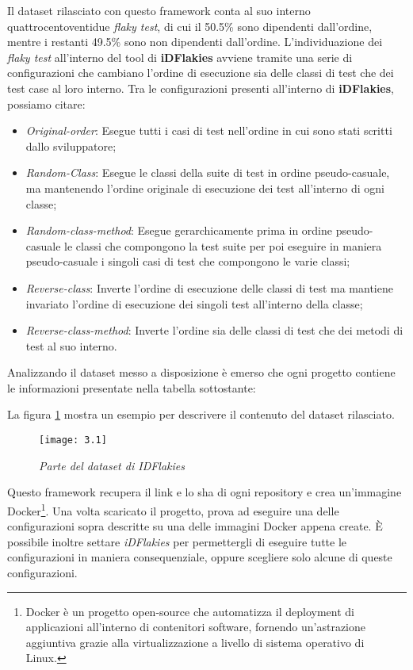 Il dataset rilasciato con questo framework conta al suo interno
quattrocentoventidue \emph{flaky test}, di cui il 50.5\% sono dipendenti dall’ordine, mentre i restanti 49.5\% sono non dipendenti dall’ordine.
L’individuazione dei \emph{flaky test} all’interno del tool di \textbf{iDFlakies} avviene tramite una serie di configurazioni che cambiano l’ordine di esecuzione sia delle classi di test che dei test case al loro interno.
Tra le configurazioni presenti all’interno di \textbf{iDFlakies}, possiamo citare:
\begin{itemize}
	\item \emph{Original-order}: Esegue tutti i casi di test nell’ordine in cui sono stati scritti
	dallo sviluppatore;
	\item \emph{Random-Class}: Esegue le classi della suite di test in ordine pseudo-casuale, ma mantenendo l’ordine originale di esecuzione dei test all’interno di ogni classe;
	\item \emph{Random-class-method}: Esegue gerarchicamente prima in ordine pseudo-casuale le classi che compongono la test suite per poi eseguire in maniera pseudo-casuale i singoli casi di test che compongono le varie classi;
	\item \emph{Reverse-class}: Inverte l’ordine di esecuzione delle classi di test ma mantiene invariato l’ordine di esecuzione dei singoli test all’interno della classe;
	\item \emph{Reverse-class-method}: Inverte l’ordine sia delle classi di test che dei metodi di test al suo interno.
\end{itemize}

Analizzando il dataset messo a disposizione è emerso che ogni progetto contiene le informazioni presentate nella tabella sottostante:
\begin{table}[h]
	\centering
\end{table}
La figura \ref{fig:datasetRilasciato} mostra un esempio per descrivere il contenuto del dataset
rilasciato.
\newpage
\begin{figure}[h]
	\centering
	\texttt{[image: 3.1]}
	\caption{\emph{Parte del dataset di IDFlakies}}
	\label{fig:datasetRilasciato}
\end{figure}
Questo framework recupera il link e lo sha di ogni repository e crea
un’immagine Docker\footnote{Docker è un progetto open-source che automatizza il deployment di applicazioni all'interno di contenitori software, fornendo un'astrazione aggiuntiva grazie alla virtualizzazione a livello di sistema operativo di Linux.}. Una volta scaricato il progetto, prova ad eseguire una delle configurazioni sopra descritte su una delle immagini Docker appena create. È possibile inoltre settare \emph{iDFlakies} per permettergli di eseguire tutte le
configurazioni in maniera consequenziale, oppure scegliere solo alcune di queste configurazioni. 

